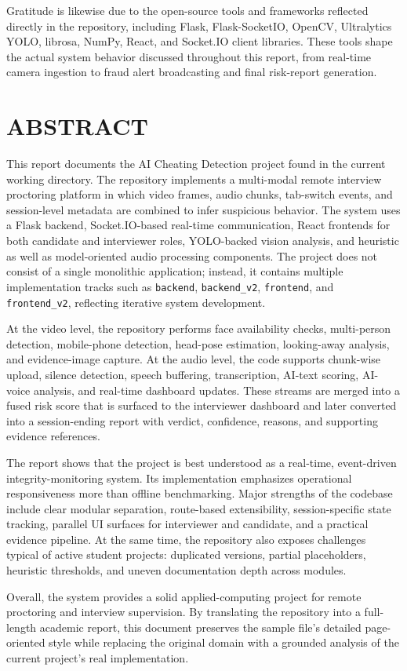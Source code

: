 \documentclass[12pt,a4paper]{extreport}
\newcommand{\frontchapter}[1]{
  \phantomsection
  \chapter*{#1}
  \addcontentsline{toc}{chapter}{#1}
}
\begin{document}
Gratitude is likewise due to the open-source tools and frameworks reflected directly in the repository, including Flask, Flask-SocketIO, OpenCV, Ultralytics YOLO, librosa, NumPy, React, and Socket.IO client libraries. These tools shape the actual system behavior discussed throughout this report, from real-time camera ingestion to fraud alert broadcasting and final risk-report generation.

\frontchapter{ABSTRACT}
This report documents the AI Cheating Detection project found in the current working directory. The repository implements a multi-modal remote interview proctoring platform in which video frames, audio chunks, tab-switch events, and session-level metadata are combined to infer suspicious behavior. The system uses a Flask backend, Socket.IO-based real-time communication, React frontends for both candidate and interviewer roles, YOLO-backed vision analysis, and heuristic as well as model-oriented audio processing components. The project does not consist of a single monolithic application; instead, it contains multiple implementation tracks such as \texttt{backend}, \texttt{backend\_v2}, \texttt{frontend}, and \texttt{frontend\_v2}, reflecting iterative system development.

At the video level, the repository performs face availability checks, multi-person detection, mobile-phone detection, head-pose estimation, looking-away analysis, and evidence-image capture. At the audio level, the code supports chunk-wise upload, silence detection, speech buffering, transcription, AI-text scoring, AI-voice analysis, and real-time dashboard updates. These streams are merged into a fused risk score that is surfaced to the interviewer dashboard and later converted into a session-ending report with verdict, confidence, reasons, and supporting evidence references.

The report shows that the project is best understood as a real-time, event-driven integrity-monitoring system. Its implementation emphasizes operational responsiveness more than offline benchmarking. Major strengths of the codebase include clear modular separation, route-based extensibility, session-specific state tracking, parallel UI surfaces for interviewer and candidate, and a practical evidence pipeline. At the same time, the repository also exposes challenges typical of active student projects: duplicated versions, partial placeholders, heuristic thresholds, and uneven documentation depth across modules.

Overall, the system provides a solid applied-computing project for remote proctoring and interview supervision. By translating the repository into a full-length academic report, this document preserves the sample file's detailed page-oriented style while replacing the original domain with a grounded analysis of the current project's real implementation.
\end{document}
